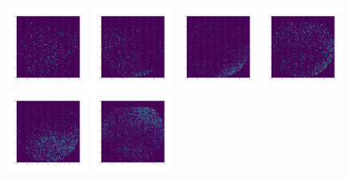 \documentclass[12pt,prd]{article}
\begin{document}
\begin{figure}[h!]
\includegraphics[width=0.24\textwidth]{../figures/stars_passing_cutgaiascan_l101_2_b58_4_ra212_7_dec55_2_npy_3.pdf}
\includegraphics[width=0.24\textwidth]{../figures/stars_passing_cutgaiascan_l101_2_b58_4_ra212_7_dec55_2_npy_4.pdf}
\includegraphics[width=0.24\textwidth]{../figures/stars_passing_cutgaiascan_l101_2_b58_4_ra212_7_dec55_2_npy_5.pdf}
\includegraphics[width=0.24\textwidth]{../figures/stars_passing_cutgaiascan_l101_2_b58_4_ra212_7_dec55_2_npy_6.pdf}
\includegraphics[width=0.24\textwidth]{../figures/stars_passing_cutgaiascan_l101_2_b58_4_ra212_7_dec55_2_npy_7.pdf}
\includegraphics[width=0.24\textwidth]{../figures/stars_passing_cutgaiascan_l101_2_b58_4_ra212_7_dec55_2_npy_8.pdf}

\end{figure}
\end{document}
